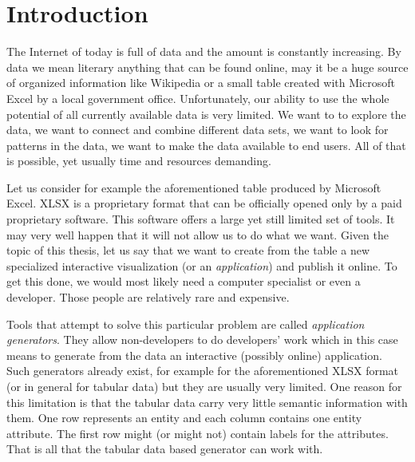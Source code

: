 \chapter*{Introduction}

The Internet of today is full of data and the amount is constantly increasing. By data we mean literary anything that can be found online, may it be a huge source of organized information like Wikipedia or a small table created with Microsoft Excel by a local government office. Unfortunately, our ability to use the whole potential of all currently available data is very limited. We want to to explore the data, we want to connect and combine different data sets, we want to look for patterns in the data, we want to make the data available to end users. All of that is possible, yet usually time and resources demanding. 

Let us consider for example the aforementioned table produced by Microsoft Excel.  XLSX is a proprietary format that can be officially opened only by a paid proprietary software. This software offers a large yet still limited set of tools. It may very well happen that it will not allow us to do what we want. Given the topic of this thesis, let us say that we want to create from the table a new specialized interactive visualization (or an \textit{application}) and publish it online. To get this done,  we would most likely need a computer specialist or  even a developer. Those people are relatively rare and expensive.

Tools that attempt to solve this particular problem are called \emph{application generators}. They allow non-developers to do developers' work which in this case means to generate from the data an interactive (possibly online) application. Such generators already exist, for example for the aforementioned XLSX format (or in general for tabular data) but they are usually very limited. One reason for this limitation is that the tabular data carry very little semantic information with them. One row represents an entity and each column contains one entity attribute. The first row might (or might not) contain labels for the attributes. That is all that the tabular data based generator can work with.

